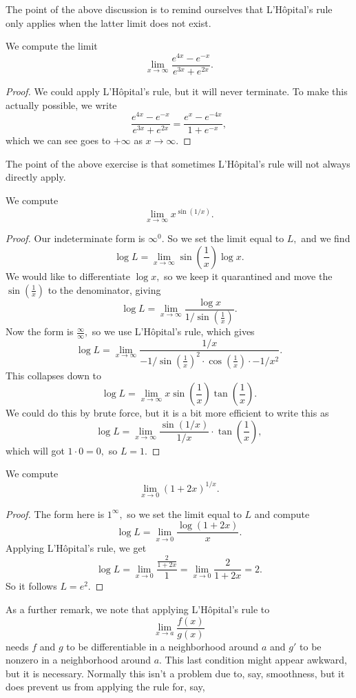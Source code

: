 The point of the above discussion is to remind ourselves that L'H\^opital's rule only applies when the latter limit does not exist.
\begin{exercise}
	We compute the limit
	\[\lim_{x\to\infty}\frac{e^{4x}-e^{-x}}{e^{3x}+e^{2x}}.\]
\end{exercise}
\begin{proof}
	We could apply L'H\^opital's rule, but it will never terminate. To make this actually possible, we write
	\[\frac{e^{4x}-e^{-x}}{e^{3x}+e^{2x}}=\frac{e^{x}-e^{-4x}}{1+e^{-x}},\]
	which we can see goes to $\boxed{+\infty}$ as $x\to\infty.$
\end{proof}
The point of the above exercise is that sometimes L'H\^opital's rule will not always directly apply.
\begin{exercise}
	We compute
	\[\lim_{x\to\infty}x^{\sin(1/x)}.\]
\end{exercise}
\begin{proof}
	Our indeterminate form is $\infty^0.$ So we set the limit equal to $L,$ and we find
	\[\log L=\lim_{x\to\infty}\sin\left(\frac1x\right)\log x.\]
	We would like to differentiate $\log x,$ so we keep it quarantined and move the $\sin\left(\frac1x\right)$ to the denominator, giving
	\[\log L=\lim_{x\to\infty}\frac{\log x}{1/\sin\left(\frac1x\right)}.\]
	Now the form is $\frac\infty\infty,$ so we use L'H\^opital's rule, which gives
	\[\log L=\lim_{x\to\infty}\frac{1/x}{-1/\sin\left(\frac1x\right)^2\cdot\cos\left(\frac1x\right)\cdot-1/x^2}.\]
	This collapses down to
	\[\log L=\lim_{x\to\infty}x\sin\left(\frac1x\right)\tan\left(\frac1x\right).\]
	We could do this by brute force, but it is a bit more efficient to write this as
	\[\log L=\lim_{x\to\infty}\frac{\sin\left(1/x\right)}{1/x}\cdot\tan\left(\frac1x\right),\]
	which will got $1\cdot0=0,$ so $L=\boxed1.$
\end{proof}
\begin{exercise}
	We compute
	\[\lim_{x\to0}(1+2x)^{1/x}.\]
\end{exercise}
\begin{proof}
	The form here is $1^\infty,$ so we set the limit equal to $L$ and compute
	\[\log L=\lim_{x\to0}\frac{\log(1+2x)}x.\]
	Applying L'H\^opital's rule, we get
	\[\log L=\lim_{x\to0}\frac{\frac{2}{1+2x}}1=\lim_{x\to0}\frac2{1+2x}=2.\]
	So it follows $L=\boxed{e^2}.$
\end{proof}
As a further remark, we note that applying L'H\^opital's rule to
\[\lim_{x\to a}\frac{f(x)}{g(x)}\]
needs $f$ and $g$ to be differentiable in a neighborhood around $a$ and $g'$ to be nonzero in a neighborhood around $a.$ This last condition might appear awkward, but it is necessary. Normally this isn't a problem due to, say, smoothness, but it does prevent us from applying the rule for, say,
